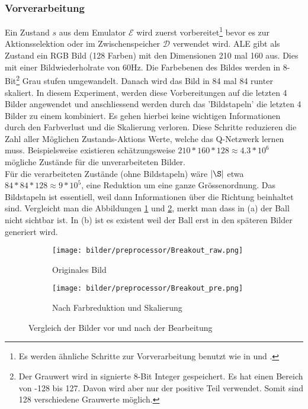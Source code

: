 \documentclass[a4paper,titlepage]{article}
\numberwithin{equation}{section} %
\begin{document}
{\subsubsection{Vorverarbeitung}
Ein Zustand $s$ aus dem Emulator $\mathcal{E}$ wird zuerst vorbereitet\footnote{Es werden ähnliche Schritte zur Vorverarbeitung benutzt wie in \cite{Bellemare_2013} und \cite{vanhasseltDeepReinforcementLearning2015}.} bevor es zur Aktionsselektion oder im Zwischenspeicher $\mathcal{D}$ verwendet wird. ALE gibt als Zustand ein RGB Bild (128 Farben) mit den Dimensionen 210 mal 160 aus. Dies mit einer Bildwiederholrate von 60Hz. Die Farbebenen des Bildes werden in 8-Bit\footnote{Der Grauwert wird in signierte 8-Bit Integer gespeichert. Es hat einen Bereich von -128 bis 127. Davon wird aber nur der positive Teil verwendet. Somit sind 128 verschiedene Grauwerte möglich.} Grau stufen umgewandelt. Danach wird das Bild in 84 mal 84 runter skaliert. In diesem Experiment, werden diese Vorbereitungen auf die letzten 4 Bilder angewendet und anschliessend werden durch das 'Bildstapeln' die letzten 4 Bilder zu einem kombiniert. Es gehen hierbei keine wichtigen Informationen durch den Farbverlust und die Skalierung verloren. Diese Schritte reduzieren die Zahl aller Möglichen Zustands-Aktions Werte, welche das Q-Netzwerk lernen muss. Beispielsweise existieren schätzungsweise $210*160*128 \approx 4.3*10^6$ mögliche Zustände für die unverarbeiteten Bilder.\\ Für die verarbeiteten Zustände (ohne Bildstapeln) wäre $|\S|$ etwa $84*84*128 \approx 9*10^5$, eine Reduktion um eine ganze Grössenordnung. Das Bildstapeln ist essentiell, weil dann Informationen über die Richtung beinhaltet sind. Vergleicht man die Abbildungen \ref{fig:Breakout_raw} und \ref{fig:Breakout_processed}, merkt man dass in (a) der Ball nicht sichtbar ist. In (b) ist es existent weil der Ball erst in den späteren Bilder generiert wird.



\begin{figure}
	\centering
	\begin{subfigure}{0.5\textwidth}
		\centering
		\texttt{[image: bilder/preprocessor/Breakout\_raw.png]}
		\caption{Originales Bild}
		\label{fig:Breakout_raw}
	\end{subfigure}%
	\begin{subfigure}{0.5\textwidth}
		\centering
		\texttt{[image: bilder/preprocessor/Breakout\_pre.png]}
		\caption{Nach Farbreduktion und Skalierung}
		\label{fig:Breakout_processed}
	\end{subfigure}%
\caption{Vergleich der Bilder vor und nach der Bearbeitung}
\label{figs:vergleich}
\end{figure}

}
\end{document}
